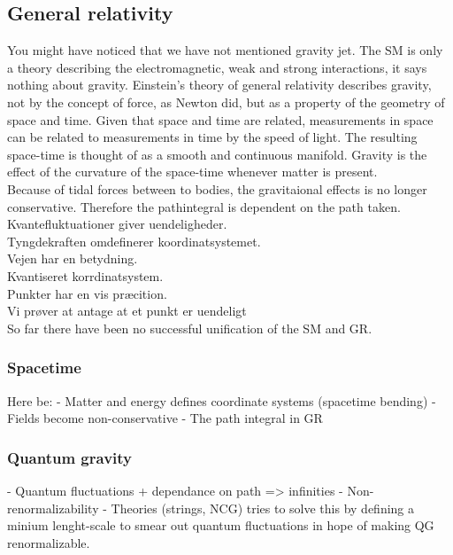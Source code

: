 \subsection{General relativity}
You might have noticed that we have not mentioned gravity jet. The SM is only a theory describing the electromagnetic, weak and strong interactions, it says nothing about gravity. Einstein's theory of general relativity describes gravity, not by the concept of force, as Newton did, but as a property of the geometry of space and time. Given that space and time are related, measurements in space can be related to measurements in time by the speed of light. The resulting space-time is thought of as a smooth and continuous manifold. Gravity is the effect of the curvature of the space-time whenever matter is present.\\
Because of tidal forces between to bodies, the gravitaional effects is no longer conservative. Therefore the pathintegral is dependent on the path taken.\\
Kvantefluktuationer giver uendeligheder. \\
Tyngdekraften omdefinerer koordinatsystemet.\\ 
Vejen har en betydning. \\
Kvantiseret korrdinatsystem.\\ 
Punkter har en vis præcition. \\
Vi prøver at antage at et punkt er uendeligt \\
So far there have been no successful unification of the SM and GR.

\subsubsection{Spacetime}
Here be:
- Matter and energy defines coordinate systems (spacetime bending)
- Fields become non-conservative
- The path integral in GR

\subsubsection{Quantum gravity}
- Quantum fluctuations + dependance on path => infinities
- Non-renormalizability
- Theories (strings, NCG) tries to solve this by defining a minium lenght-scale
  to smear out quantum fluctuations in hope of making QG renormalizable.
